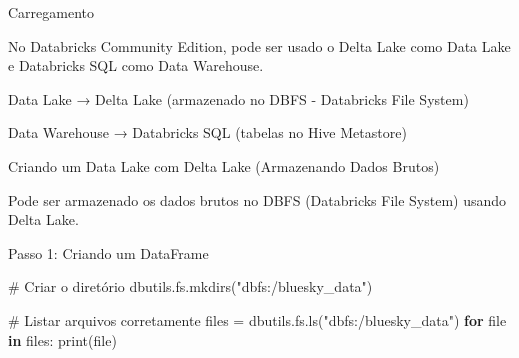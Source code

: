 \documentclass[
  letterpaper,
  DIV=11,
  numbers=noendperiod]{scrartcl}
\newenvironment{Shaded}{\begin{snugshade}}{\end{snugshade}}
\newcommand{\BuiltInTok}[1]{\textcolor[rgb]{0.00,0.23,0.31}{#1}}
\newcommand{\CommentTok}[1]{\textcolor[rgb]{0.37,0.37,0.37}{#1}}
\newcommand{\ControlFlowTok}[1]{\textcolor[rgb]{0.00,0.23,0.31}{\textbf{#1}}}
\newcommand{\KeywordTok}[1]{\textcolor[rgb]{0.00,0.23,0.31}{\textbf{#1}}}
\newcommand{\NormalTok}[1]{\textcolor[rgb]{0.00,0.23,0.31}{#1}}
\newcommand{\OperatorTok}[1]{\textcolor[rgb]{0.37,0.37,0.37}{#1}}
\newcommand{\StringTok}[1]{\textcolor[rgb]{0.13,0.47,0.30}{#1}}
\begin{document}
Carregamento

No Databricks Community Edition, pode ser usado o Delta Lake como Data
Lake e Databricks SQL como Data Warehouse.

Data Lake → Delta Lake (armazenado no DBFS - Databricks File System)

Data Warehouse → Databricks SQL (tabelas no Hive Metastore)

Criando um Data Lake com Delta Lake (Armazenando Dados Brutos)

Pode ser armazenado os dados brutos no DBFS (Databricks File System)
usando Delta Lake.

Passo 1: Criando um DataFrame

\begin{Shaded}
\begin{Highlighting}[]
\CommentTok{\# Criar o diretório}
\NormalTok{dbutils.fs.mkdirs(}\StringTok{"dbfs:/bluesky\_data"}\NormalTok{)}

\CommentTok{\# Listar arquivos corretamente}
\NormalTok{files }\OperatorTok{=}\NormalTok{ dbutils.fs.ls(}\StringTok{"dbfs:/bluesky\_data"}\NormalTok{)}
\ControlFlowTok{for} \BuiltInTok{file} \KeywordTok{in}\NormalTok{ files:}
    \BuiltInTok{print}\NormalTok{(}\BuiltInTok{file}\NormalTok{)}
\end{Highlighting}
\end{Shaded}
\end{document}
